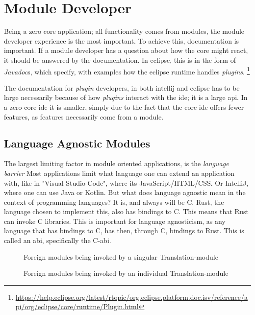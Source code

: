 \section{Module Developer}

Being a zero core application; all functionality comes from modules, the module
developer experience is the most important. To achieve this, documentation is
important. If a module developer has a question about how the core might react,
it should be answered by the documentation. In \gls{eclipse}, this is in the
form of \textit{Javadoc}s, which specify, with examples how the \gls{eclipse}
runtime handles \textit{plugins}. \footnote{\url{https://help.eclipse.org/latest/rtopic/org.eclipse.platform.doc.isv/reference/api/org/eclipse/core/runtime/Plugin.html}}

The documentation for \textit{plugin} developers, in both \gls{intellij} and
\gls{eclipse} has to be large necessarily because of how \textit{plugins}
interact with the \gls{ide}; it is a large \gls{api}. In a zero core \gls{ide}
it is smaller, simply due to the fact that the core \gls{ide} offers fewer
features, as features necessarily come from a module.

\subsection{Language Agnostic Modules}

The largest limiting factor in module oriented applications, is the
\textit{language barrier} Most applications limit what language one can extend
an application with, like in "Visual Studio Code", where its
JavaScript/HTML/CSS. Or IntelliJ, where one can use Java or Kotlin. But what
does language agnostic mean in the context of programming languages? It is, and
always will be C. Rust, the language chosen to implement this, also has bindings
to C. This means that Rust can invoke C libraries. This is important for
language agnosticism, as any language that has bindings to C, has then, through
C, bindings to Rust. This is called an \gls{abi}, specifically the C-\gls{abi}.

\begin{figure}
  \begin{center}
    
    \caption{Foreign modules being invoked by a singular Translation-module}
    \label{fig:fm1}
  \end{center}
\end{figure}

\begin{figure}
  \begin{center}
    
    \caption{Foreign modules being invoked by an individual Translation-module}
    \label{fig:fm2}
  \end{center}
\end{figure}

